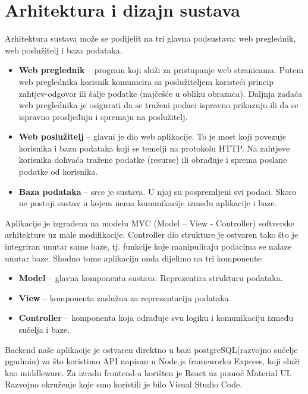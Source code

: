 \chapter{Arhitektura i dizajn sustava}
		
		Arhitektura sustava može se podijelit na tri glavna podsustava: web preglednik, web poslužitelj i baza podataka.
	\begin{itemize}
		\item 	\textbf{Web preglednik} – program koji služi za pristupanje web stranicama. Putem web preglednika korisnik komunicira sa poslužiteljem koristeći princip zahtjev-odgovor ili šalje podatke (najčešće u obliku obrazaca). Daljnja zadaća web preglednika je osigurati da se traženi podaci ispravno prikazuju ili da se ispravno prosljeđuju i spremaju na poslužitelj.
		\item 	\textbf{Web poslužitelj} – glavni je dio web aplikacije. To je most koji povezuje korisnika i bazu podataka koji se temelji na protokolu HTTP. Na zahtjeve korisnika dohvaća tražene podatke (resurse) ili obrađuje i sprema poslane podatke od korisnika.
		\item 	\textbf{Baza podataka} – srce je sustava. U njoj su pospremljeni svi podaci. Skoro ne postoji sustav u kojem nema komunikacije između aplikacije i baze.	
	\end{itemize}
		Aplikacije je izgrađena na modelu MVC (Model – View - Controller) softverske arhitekture uz male modifikacije. Controller dio strukture je ostvaren tako što je integriran unutar same baze, tj. funkcije koje manipuliraju podacima se nalaze unutar baze. Shodno tome aplikaciju onda dijelimo na tri komponente:
	\begin{itemize}
		\item	\textbf{Model} – glavna komponenta sustava. Reprezentira strukturu podataka.
		\item	\textbf{View} – komponenta zaslužna za reprezentaciju podataka.
		\item	\textbf{Controller} – komponenta koja odrađuje svu logiku i komunikaciju između sučelja i baze.
	\end{itemize}
	
		\smallskip
		Backend naše aplikacije je ostvaren direktno u bazi postgreSQL(razvojno sučelje pgadmin) za što koristimo API napisan u Node.js frameworku Express, koji služi kao middleware. Za izradu frontend-a korišten je React uz pomoć Material UI. Razvojno okruženje koje smo koristili je bilo Visual Studio Code.
		

